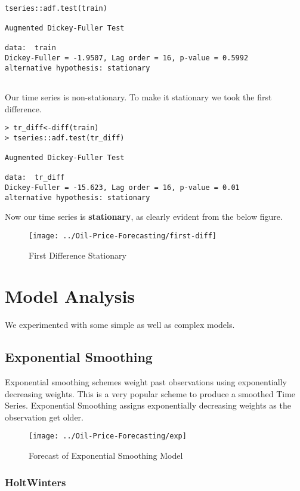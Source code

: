 \documentclass[11pt,a4paper]{article}
\begin{document}
\begin{lstlisting}

tseries::adf.test(train)

Augmented Dickey-Fuller Test

data:  train
Dickey-Fuller = -1.9507, Lag order = 16, p-value = 0.5992
alternative hypothesis: stationary


\end{lstlisting}
Our time series is non-stationary. To make it stationary we took the first difference. 
\begin{lstlisting}
> tr_diff<-diff(train)
> tseries::adf.test(tr_diff)

Augmented Dickey-Fuller Test

data:  tr_diff
Dickey-Fuller = -15.623, Lag order = 16, p-value = 0.01
alternative hypothesis: stationary

\end{lstlisting}

Now our time series is \textbf{stationary}, as clearly evident from the below figure.
\begin{figure}[h!]
	\centering
	\texttt{[image: ../Oil-Price-Forecasting/first-diff]}
	\caption{First Difference Stationary}
	\label{fig:first-diff}
\end{figure}




\section{Model Analysis}
We experimented with some simple as well as complex models.
\subsection{Exponential Smoothing}
Exponential smoothing schemes weight past observations using exponentially decreasing weights. This is a very popular scheme to produce a smoothed Time Series. Exponential Smoothing assigns exponentially decreasing weights as the observation get older.
	
\begin{figure}[h!]
	\centering
	\texttt{[image: ../Oil-Price-Forecasting/exp]}
	\caption{Forecast of Exponential Smoothing Model}
	\label{fig:exp}
\end{figure}

\subsubsection{HoltWinters}
\end{document}
